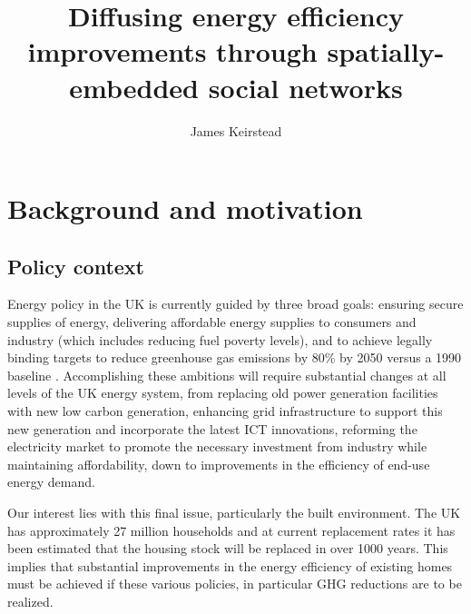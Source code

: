 \documentclass{jk-article}
\title{Diffusing energy efficiency improvements through spatially-embedded social networks}
\author{James Keirstead}
\begin{document}
\maketitle

\section{Background and motivation}

\subsection{Policy context}
Energy policy in the UK is currently guided by three broad goals: ensuring secure supplies of energy, delivering affordable energy supplies to consumers and industry (which includes reducing fuel poverty levels), and to achieve legally binding targets to reduce greenhouse gas emissions by 80\% by 2050 versus a 1990 baseline \cite{DECC_2012}.  Accomplishing these ambitions will require substantial changes at all levels of the UK energy system, from replacing old power generation facilities with new low carbon generation, enhancing grid infrastructure to support this new generation and incorporate the latest ICT innovations, reforming the electricity market to promote the necessary investment from industry while maintaining affordability, down to improvements in the efficiency of end-use energy demand.

Our interest lies with this final issue, particularly the built environment.  The UK has approximately 27 million households and at current replacement rates it has been estimated that the housing stock will be replaced in over 1000 years.  This implies that substantial improvements in the energy efficiency of existing homes must be achieved if these various policies, in particular GHG reductions are to be realized.
\end{document}
